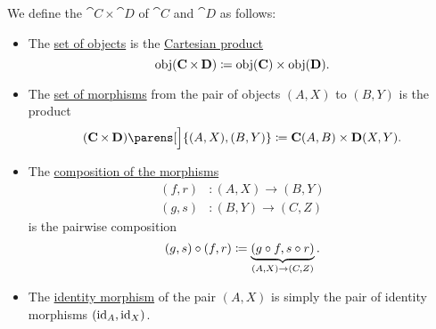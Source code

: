 \begin{definition}\label{def:product_category}
  We define the  \( \cat{C} \times \cat{D} \) of \( \cat{C} \) and \( \cat{D} \) as follows:

  \begin{itemize}
    \item The \hyperref[def:category/objects]{set of objects} is the \hyperref[def:cartesian_product]{Cartesian product}
    \begin{equation}\label{eq:def:product_category/objects}
      \obj(\cat{C} \times \cat{D}) \coloneqq \obj(\cat{C}) \times \obj(\cat{D}).
    \end{equation}

    \item The \hyperref[def:category/morphisms]{set of morphisms} from the pair of objects \( (A, X) \) to \( (B, Y) \) is the product
    \begin{equation}\label{eq:def:product_category/morphisms}
      (\cat{C} \times \cat{D})\parens[\Big]{ (A, X), (B, Y) } \coloneqq \cat{C}(A, B) \times \cat{D}(X, Y).
    \end{equation}

    \item The \hyperref[def:category/composition]{composition of the morphisms}
    \begin{align*}
      (f, r)&: (A, X) \to (B, Y) \\
      (g, s)&: (B, Y) \to (C, Z)
    \end{align*}
    is the pairwise composition
    \begin{equation}\label{eq:def:product_category/composition}
      (g, s) \bincirc (f, r) \coloneqq \underbrace{(g \bincirc f, s \bincirc r)}_{(A, X) \to (C, Z)}.
    \end{equation}

    \item The \hyperref[def:category/identity]{identity morphism} of the pair \( (A, X) \) is simply the pair of identity morphisms \( (\operatorname{id}_A, \operatorname{id}_X) \).
  \end{itemize}
\end{definition}

